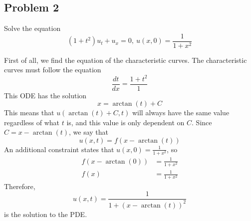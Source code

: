 \documentclass{ben}
\begin{document}
\subsection{Problem 2}
\noindent
Solve the equation
\[
(1 + t^2)u_t + u_x = 0,\ u(x, 0) = \frac{1}{1 + x^2}
\]
\begin{solution}
    First of all, we find the equation of the characteristic curves. The characteristic curves must
    follow the equation
    \[
        \frac{dt}{dx} = \frac{1 + t^2}{1}
    \]
    This ODE has the solution
    \[
        x = \arctan(t) + C
    \]
    This means that $u(\arctan(t) + C, t)$ will always have the same value regardless of what $t$
    is, and this value is only dependent on $C$. Since $C = x - \arctan(t)$, we say that
    \[u(x, t) = f(x - \arctan(t))\]
    An additional constraint states that $u(x, 0) = \frac{1}{1 + x^2}$, so
    \begin{align*}
        f(x - \arctan(0)) &= \frac{1}{1 + x^2}\\
        f(x) &= \frac{1}{1 + x^2}
    \end{align*}
    Therefore,
    \[
    u(x, t) = \frac{1}{1 + \left(x - \arctan(t)\right)^2}
    \]
    is the solution to the PDE.
\end{solution}
\newpage
\end{document}
